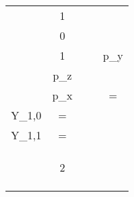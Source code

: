 \begin{longtable}{c|c|c|c}
\begin{minipage}{0.04\textwidth}
		\vspace*{-3.5ex}%
		\[
		\begin{aligned}
			-&1\vphantom{\sqrt{\frac{3}{4 \pi}}} \\
			 &0\vphantom{\sqrt{\frac{3}{4 \pi}}} \\
			 &1\vphantom{\sqrt{\frac{3}{4 \pi}}}
		\end{aligned}
		\]
	\end{minipage}
	&
	\begin{minipage}{0.05\textwidth}
		\vspace*{-4ex}%
		\[
		\begin{aligned}
			&p_{y}\vphantom{\sqrt{\frac{3}{4 \pi}}} \\
			&p_{z}\vphantom{\sqrt{\frac{3}{4 \pi}}} \\
			&p_{x}\vphantom{\sqrt{\frac{3}{4 \pi}}}
		\end{aligned}
		\]
	\end{minipage}
	& 
	\begin{minipage}{0.6\textwidth}
		\vspace*{1ex}%
		\[
		\begin{aligned}
			Y_{1,-1} &= \sqrt{\frac{3}{4 \pi}} \cdot \sin \theta \cdot \sin \varphi \\
			Y_{1,0} &= \sqrt{\frac{3}{4 \pi}} \cdot \cos \theta \\
			Y_{1,1} &= \sqrt{\frac{3}{4 \pi}} \cdot \sin \theta \cdot \cos \varphi \\
		\end{aligned}
		\]
		\vspace*{0.5ex}%
	\end{minipage}
	\\ \hline
	\begin{minipage}{0.04\textwidth}
		\vspace*{-1.5ex}%
		\[
		\begin{aligned}
			&\vphantom{\sqrt{\frac{15}{\pi}}} \\
			&\vphantom{\sqrt{\frac{15}{\pi}}} \\
 		 	&2\vphantom{\sqrt{\frac{15}{\pi}}} \\
 		 	&\vphantom{\sqrt{\frac{15}{\pi}}} \\
 		 	&\vphantom{\sqrt{\frac{15}{\pi}}}
		\end{aligned}
		\]
	\end{minipage}
	& 
	\begin{minipage}{0.04\textwidth}
		\vspace*{-1.5ex}%
		\[
		\begin{aligned}

\end{aligned}\]
\end{minipage}
\end{longtable}

